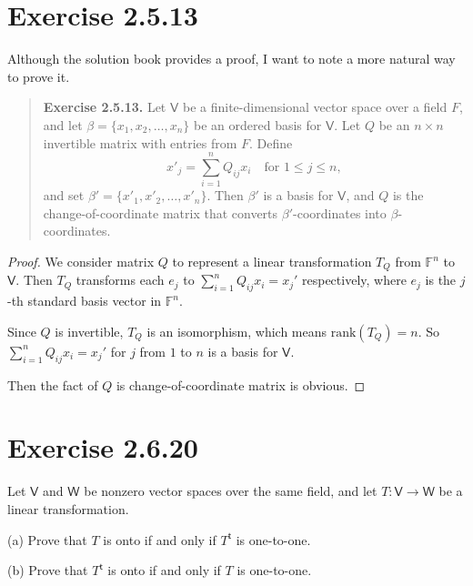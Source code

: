 \documentclass{article}
\newcommand{\0}{\mathit{0}}
\begin{document}
\section{Exercise 2.5.13}
Although the solution book provides a proof, I want to note a more natural way to prove it.

\begin{quotation}
    \textbf{Exercise 2.5.13.} Let $\mathsf{V}$ be a finite-dimensional vector space over a field $F$, and let
    $\beta = \{x_1, x_2, \dots, x_n\}$ be an ordered basis for $\mathsf{V}$. Let $Q$ be an $n \times n$
    invertible matrix with entries from $F$. Define
    \[
        x'_j = \sum_{i=1}^{n} Q_{ij} x_i \quad \text{for } 1 \leq j \leq n,
    \]
    and set $\beta' = \{x'_1, x'_2, \dots, x'_n\}$.
    Then $\beta'$ is a basis for $\mathsf{V}$, and $Q$ is the change-of-coordinate matrix
    that converts $\beta'$-coordinates into $\beta$-coordinates.
\end{quotation}

\begin{proof}
    We consider matrix $Q$ to represent a linear transformation $T_Q$ from $\mathbb{F}^n$ to
    $\mathsf{V}$. Then $T_Q$ transforms each $e_j$ to $\sum_{i=1}^{n} Q_{ij} x_i=x_j'$
    respectively, where $e_j$ is the $j$-th standard basis vector in $\mathbb{F}^n$.

    Since $Q$ is invertible, $T_Q$ is an isomorphism, which means $\mathrm{rank}(T_Q) = n$.
    So $\sum_{i=1}^{n} Q_{ij} x_i=x_j'$ for $j$ from $1$ to $n$ is a basis for $\mathsf{V}$.

    Then the fact of $Q$ is change-of-coordinate matrix is obvious.
\end{proof}

\section{Exercise 2.6.20}
Let $\mathsf{V}$ and $\mathsf{W}$ be nonzero vector spaces over the same field,
and let $T: \mathsf{V} \to \mathsf{W}$ be a linear transformation.

(a) Prove that $T$ is onto if and only if $T^{\mathsf{t}}$ is one-to-one.

(b) Prove that $T^{\mathsf{t}}$ is onto if and only if $T$ is one-to-one.
\end{document}

